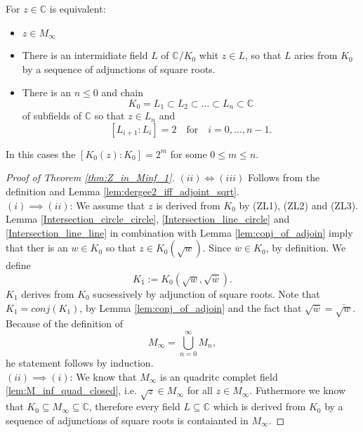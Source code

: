 
\begin{theorem}
    \label{thm:Z_in_Minf_1}
    For $z \in \mathbb{C}$ is equivalent:
    \begin{itemize}
        \item $z \in M_{\infty}$
        \item There is an intermidiate field $L$ of $\mathbb{C}/K_0$ whit $z \in L$, so that $L$ aries from $K_0$ by a sequence of adjunctions of square roots.
        \item There is an $n\le 0$ and chain 
            $$K_0 = L_1 \subset L_2 \subset \ldots \subset L_n \subset \mathbb{C}$$
            of subfields of $\mathbb{C}$ so that $z \in L_n$ and 
            $$ [L_{i+1}:L_i] = 2 \quad \text{for} \quad i = 0, \ldots, n-1.$$
    \end{itemize}
\end{theorem}

\begin{remark}
    \label{rem:Z_in_Minf_1}
    In this cases the $[K_0(z):K_0] = 2^m$ for some $0 \le m \le n$.
\end{remark}
\begin{proof}[Proof of Theorem \ref{thm:Z_in_Minf_1}]
    $(ii) \iff (iii)$ Follows from the definition and Lemma \ref{lem:dergee2_iff_adjoint_sqrt}.\\
    $(i) \implies (ii)$: We assume that $z$ is derived from $K_0$ by (ZL1), (ZL2) and (ZL3). %
    Lemma \ref{Intersection_circle_circle}, \ref{Intersection_line_circle} and \ref{Intersection_line_line} in combination with Lemma \ref{lem:conj_of_adjoin} 
    imply that ther is an $w \in K_0$ so that $z \in K_0(\sqrt{w})$. Since $\overline{w} \in K_0$, by definition. We define
    $$K_1 := K_0(\sqrt{w},\sqrt{\overline{w}}).$$
    $K_1$ derives from $K_0$ sucsessively by adjunction of square roots. Note that $K_1 = conj(K_1)$, by Lemma \ref{lem:conj_of_adjoin} and the fact that $\sqrt{\overline{w}} = \overline{\sqrt{w}}$.
    Because of the definition of $$M_{\infty} = \bigcup_{n=0}^{\infty} M_n,$$
    he statement follows by induction.\\ %
    $(ii) \implies (i)$: We know that $M_{\infty}$ is an quadritc complet field \ref{lem:M_inf_quad_closed}, i.e. $\sqrt{z} \in M_{\infty}$ for all $z \in M_{\infty}$.
    Futhermore we know that $K_0\subseteq M_{\infty} \subseteq \mathbb{C}$, %
    therefore every field $L\subseteq \mathbb{C}$ which is derived from $K_0$ by a sequence of adjunctions of square roots is contaianted in $M_{\infty}$.
\end{proof}